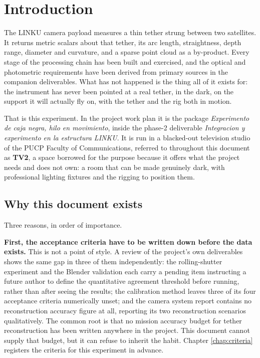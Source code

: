 \chapter*{Introduction}

The LINKU camera payload measures a thin tether strung between two satellites.
It returns metric scalars about that tether, its arc length, straightness,
depth range, diameter and curvature, and a sparse point cloud as a by-product.
Every stage of the processing chain has been built and exercised, and the
optical and photometric requirements have been derived from primary sources in
the companion deliverables. What has not happened is the thing all of it exists
for: the instrument has never been pointed at a real tether, in the dark, on
the support it will actually fly on, with the tether and the rig both in
motion.

That is this experiment. In the project work plan \cite{linku_workplan} it is
the package \emph{Experimento de caja negra, hilo en movimiento}, inside the
phase-2 deliverable \emph{Integracion y experimento en la estructura LINKU}. It
is run in a blacked-out television studio of the PUCP Faculty of
Communications, referred to throughout this document as \textbf{TV2}, a space
borrowed for the purpose because it offers what the project needs and does not
own: a room that can be made genuinely dark, with professional lighting
fixtures and the rigging to position them.

\section*{Why this document exists}

Three reasons, in order of importance.

\textbf{First, the acceptance criteria have to be written down before the data
exists.} This is not a point of style. A review of the project's own
deliverables shows the same gap in three of them independently: the
rolling-shutter experiment and the Blender validation each carry a pending item
instructing a future author to define the quantitative agreement threshold
before running, rather than after seeing the results; the calibration method
leaves three of its four acceptance criteria numerically unset; and the camera
system report \cite{linku_d5_camera_report} contains no reconstruction accuracy
figure at all, reporting its two reconstruction scenarios qualitatively. The
common root is that no mission accuracy budget for tether reconstruction has
been written anywhere in the project. This document cannot supply that budget,
but it can refuse to inherit the habit. Chapter \ref{chap:criteria} registers
the criteria for this experiment in advance.

